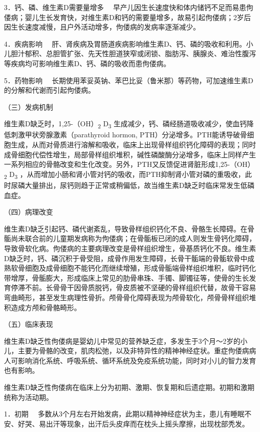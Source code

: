 {3．钙、磷、维生素D需要量增多}
　早产儿因生长速度快和体内储钙不足而易患佝偻病；婴儿生长发育快，对维生素D和钙的需要量增多，故易引起佝偻病；2岁后因生长速度减慢，且户外活动增多，佝偻病的发病率逐渐减少。

{4．疾病影响}
　肝、肾疾病及胃肠道疾病影响维生素D、钙、磷的吸收和利用。小儿胆汁郁积、总胆管扩张、先天性胆道狭窄或闭锁、脂肪泻、胰腺炎、难治性腹泻等疾病均可影响维生素D、钙、磷的吸收而患佝偻病。

{5．药物影响}
　长期使用苯妥英钠、苯巴比妥（鲁米那）等药物，可加速维生素D的分解和代谢而引起佝偻病。

（三）发病机制

维生素D缺乏时，1,25-（OH）\textsubscript{2} D\textsubscript{3}
生成减少，钙、磷经肠道吸收减少，使血钙降低刺激甲状旁腺激素（parathyroid
hormon,
PTH）分泌增多。PTH能诱导破骨细胞生成，从而对骨质进行溶解和吸收，临床上出现骨样组织钙化障碍的表现；同时成骨细胞代偿性增生，局部骨样组织堆积，碱性磷酸酶分泌增多，临床上同样产生一系列相应的骨骼改变和生化改变。另外，PTH又反馈促进肾脏形成1,25-（OH）\textsubscript{2}
D\textsubscript{3}
，从而增加小肠和肾小管对钙的吸收，而PTH抑制肾小管对磷的重吸收，此时尿磷大量排出，尿钙则趋于正常或稍偏低，故当维生素D缺乏时临床常发生低磷血症。

（四）病理改变

维生素D缺乏引起钙、磷代谢紊乱，导致骨样组织钙化不良、骨骼生长障碍。在骨骺尚未联合前的儿童期发病称为佝偻病；在骨骺板已闭的成人则发生骨钙化障碍，导致骨软化病。佝偻病的主要病理改变是骨样组织增生，骨基质钙化不良。维生素D缺乏时，钙、磷沉积于骨受阻，成骨作用发生障碍，长骨干骺端的骨骺软骨中成熟软骨细胞及成骨细胞不能钙化而继续增殖，形成骨骺端骨样组织堆积，临时钙化带增厚，骨骺膨大，形成临床上常见的肋骨串珠、手镯、脚镯征等，使骨的生长发育停滞不前。长骨骨干因骨质脱钙，骨皮质被不坚硬的骨样组织代替，故骨干容易弯曲畸形，甚至发生病理性骨折。颅骨骨化障碍表现为颅骨软化，颅骨骨样组织堆积造成方颅和骨骼畸形。

（五）临床表现

维生素D缺乏性佝偻病是婴幼儿中常见的营养缺乏症，多发生于3个月～2岁的小儿，主要为骨骼的改变，肌肉松弛，以及非特异性的精神神经症状。重症佝偻病病人可影响消化系统、呼吸系统、循环系统及免疫系统功能，同时对小儿的智力发育也有影响。

维生素D缺乏性佝偻病在临床上分为初期、激期、恢复期和后遗症期。初期和激期统称为活动期。

{1．初期}
　多数从3个月左右开始发病，此期以精神神经症状为主，患儿有睡眠不安、好哭、易出汗等现象，出汗后头皮痒而在枕头上摇头摩擦，出现枕部秃发。

